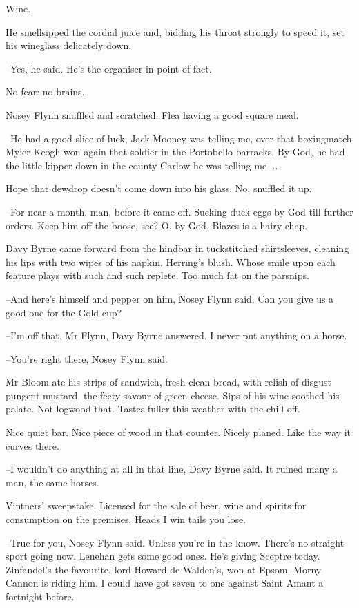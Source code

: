 Wine.

He smellsipped the cordial juice and,
bidding his throat strongly to
speed it,
set his wineglass delicately down.

--Yes,
he said.
He's the organiser in point of fact.

No fear:
no brains.

Nosey Flynn snuffled and scratched.
Flea having a good square meal.

--He had a good slice of luck,
Jack Mooney was telling me,
over that
boxingmatch Myler Keogh won again that soldier in the Portobello
barracks.
By God,
he had the little kipper down in the county Carlow he
was telling me ...

Hope that dewdrop doesn't come down into his glass.
No,
snuffled it
up.

--For near a month,
man,
before it came off.
Sucking duck eggs by God till
further orders.
Keep him off the boose,
see?
O,
by God,
Blazes is a hairy
chap.

Davy Byrne came forward from the hindbar in tuckstitched
shirtsleeves,
cleaning his lips with two wipes of his napkin.
Herring's
blush.
Whose smile upon each feature plays with such and such replete.
Too much fat on the parsnips.

--And here's himself and pepper on him,
Nosey Flynn said.
Can you give
us a good one for the Gold cup?

--I'm off that,
Mr Flynn,
Davy Byrne answered.
I never put anything on a
horse.

--You're right there,
Nosey Flynn said.

Mr Bloom ate his strips of sandwich,
fresh clean bread,
with relish of
disgust pungent mustard,
the feety savour of green cheese.
Sips of his
wine soothed his palate.
Not logwood that.
Tastes fuller this weather with
the chill off.

Nice quiet bar.
Nice piece of wood in that counter.
Nicely planed.
Like the way it curves there.

--I wouldn't do anything at all in that line,
Davy Byrne said.
It ruined
many a man,
the same horses.

Vintners' sweepstake.
Licensed for the sale of beer,
wine and spirits
for consumption on the premises.
Heads I win tails you lose.

--True for you,
Nosey Flynn said.
Unless you're in the know.
There's no
straight sport going now.
Lenehan gets some good ones.
He's giving
Sceptre today.
Zinfandel's the favourite,
lord Howard de Walden's,
won at
Epsom.
Morny Cannon is riding him.
I could have got seven to one against
Saint Amant a fortnight before.

